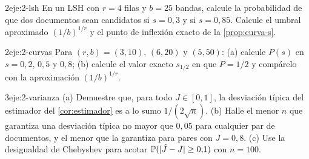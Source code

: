 \begin{ejercicio}{2}{eje:2-lsh}
En un LSH con $r=4$ filas y $b=25$ bandas, calcule la probabilidad de que dos documentos sean candidatos si $s=0{,}3$ y si $s=0{,}85$. Calcule el umbral aproximado $(1/b)^{1/r}$ y el punto de inflexión exacto de la \cref{prop:curva-s}.
\end{ejercicio}

\begin{ejercicio}{2}{eje:2-curvas}
Para $(r,b)=(3,10)$, $(6,20)$ y $(5,50)$: (a) calcule $P(s)$ en $s=0{,}2$, $0{,}5$ y $0{,}8$; (b) calcule el valor exacto $s_{1/2}$ en que $P=1/2$ y compárelo con la aproximación $(1/b)^{1/r}$.
\end{ejercicio}

\begin{ejercicio}{3}{eje:2-varianza}
(a) Demuestre que, para todo $J\in[0,1]$, la desviación típica del estimador del \cref{cor:estimador} es a lo sumo $1/(2\sqrt n)$. (b) Halle el menor $n$ que garantiza una desviación típica no mayor que $0{,}05$ para cualquier par de documentos, y el menor que la garantiza para pares con $J=0{,}8$. (c) Use la desigualdad de Chebyshev para acotar $\mathbb{P}(\lvert\hat J-J\rvert\ge 0{,}1)$ con $n=100$.
\end{ejercicio}
